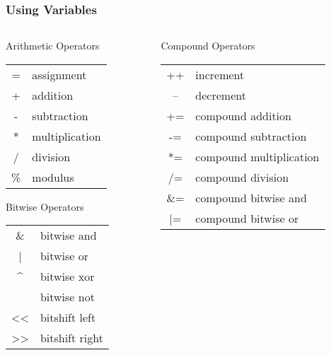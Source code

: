 \begin{frame}
	\frametitle{Using Variables}
	\begin{columns}[T]
		\begin{column}{0.5\textwidth}
			Arithmetic Operators
			\begin{tabular}{c|l}
				= & assignment\\
				+ & addition\\
				- & subtraction\\
				* & multiplication\\
				/ & division\\
				\% & modulus\\
			\end{tabular}
			
			Bitwise Operators
			\begin{tabular}{c|l}
				\& & bitwise and\\
				| & bitwise or\\
				\^{} & bitwise xor\\
				~ & bitwise not\\
				<< & bitshift left\\
				>> & bitshift right\\
			\end{tabular}
		\end{column}
		\begin{column}{0.5\textwidth}
			Compound Operators
			\begin{tabular}{c|l}
				++ & increment\\
				-- & decrement\\
				+= & compound addition\\
				-= & compound subtraction\\
				*= & compound multiplication\\
				/= & compound division\\
				\&= & compound bitwise and\\
				|= & compound bitwise or\\
			\end{tabular}
		\end{column}
	\end{columns}
\end{frame}

